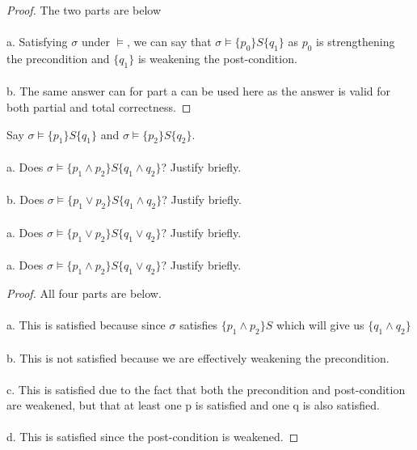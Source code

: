 \documentclass[12pt]{article}
\newenvironment{exercise}[2][Exercise]{\begin{trivlist}
\item[\hskip \labelsep {\bfseries #1}\hskip \labelsep {\bfseries #2.}]}{\end{trivlist}}
\begin{document}
\begin{proof}
The two parts are below \\ \\
a. Satisfying $\sigma$ under $\models$, we can say that $\sigma \models \{p_{0}\}S\{q_{1}\}$ as $p_{0}$ is strengthening the precondition and $\{q_{1}\}$ is weakening the post-condition. \\ \\ 
b. The same answer can for part a can be used here as the answer is valid for both partial and total correctness. 
\end{proof}
 
\begin{exercise}{4}
Say $\sigma \models \{p_{1}\} S \{q_{1}\}$ and $\sigma \models \{p_{2}\} S \{q_{2}\}$. \\ \\ 
a. Does $\sigma \models \{ p_{1} \land p_{2}\} S \{q_{1} \land q_{2}\}$? Justify briefly. \\ \\ 
b. Does $\sigma \models \{ p_{1} \lor p_{2}\} S \{q_{1} \land q_{2}\}$? Justify briefly. \\ \\ 
a. Does $\sigma \models \{ p_{1} \lor p_{2}\} S \{q_{1} \lor q_{2}\}$? Justify briefly. \\ \\ 
a. Does $\sigma \models \{ p_{1} \land p_{2}\} S \{q_{1} \lor q_{2}\}$? Justify briefly.
\end{exercise}

\begin{proof}
All four parts are below. \\ \\ 
a. This is satisfied because since $\sigma$ satisfies $\{p_{1} \land p_{2}\}S$ which will give us $\{q_{1} \land q_{2}\}$ \\ \\ 
b. This is not satisfied because we are effectively weakening the precondition. \\ \\ 
c. This is satisfied due to the fact that both the precondition and post-condition are weakened, but that at least one p is satisfied and one q is also satisfied. \\ \\ 
d. This is satisfied since the post-condition is weakened. 

\end{proof}
\end{document}
